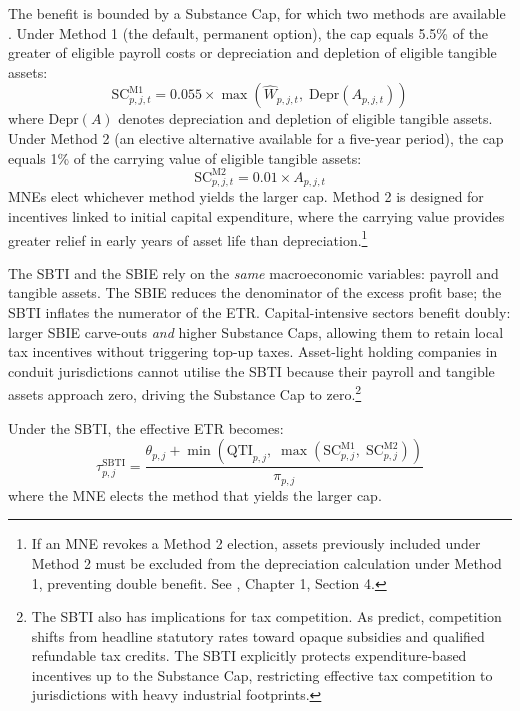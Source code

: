 \documentclass[11pt,a4paper]{article}
\begin{document}
The benefit is bounded by a Substance Cap, for which two methods are available \citep{oecd2026}. Under Method 1 (the default, permanent option), the cap equals 5.5\% of the greater of eligible payroll costs or depreciation and depletion of eligible tangible assets:
\begin{equation}\label{eq:substance_cap}
\text{SC}_{p,j,t}^{\text{M1}} = 0.055 \times \max\!\left(\hat{W}_{p,j,t},\; \text{Depr}(A_{p,j,t})\right)
\end{equation}
where $\text{Depr}(A)$ denotes depreciation and depletion of eligible tangible assets. Under Method 2 (an elective alternative available for a five-year period), the cap equals 1\% of the carrying value of eligible tangible assets:
\begin{equation}\label{eq:substance_cap_m2}
\text{SC}_{p,j,t}^{\text{M2}} = 0.01 \times A_{p,j,t}
\end{equation}
MNEs elect whichever method yields the larger cap. Method 2 is designed for incentives linked to initial capital expenditure, where the carrying value provides greater relief in early years of asset life than depreciation.\footnote{If an MNE revokes a Method 2 election, assets previously included under Method 2 must be excluded from the depreciation calculation under Method 1, preventing double benefit. See \citet{oecd2026}, Chapter 1, Section 4.}

The SBTI and the SBIE rely on the \emph{same} macroeconomic variables: payroll and tangible assets. The SBIE reduces the denominator of the excess profit base; the SBTI inflates the numerator of the ETR. Capital-intensive sectors benefit doubly: larger SBIE carve-outs \emph{and} higher Substance Caps, allowing them to retain local tax incentives without triggering top-up taxes. Asset-light holding companies in conduit jurisdictions cannot utilise the SBTI because their payroll and tangible assets approach zero, driving the Substance Cap to zero.\footnote{The SBTI also has implications for tax competition. As \citet{janeba2023} predict, competition shifts from headline statutory rates toward opaque subsidies and qualified refundable tax credits. The SBTI explicitly protects expenditure-based incentives up to the Substance Cap, restricting effective tax competition to jurisdictions with heavy industrial footprints.}

Under the SBTI, the effective ETR becomes:
\begin{equation}\label{eq:etr_sbti}
\tau_{p,j}^{\text{SBTI}} = \frac{\theta_{p,j} + \min\!\left(\text{QTI}_{p,j},\; \max\!\left(\text{SC}_{p,j}^{\text{M1}},\; \text{SC}_{p,j}^{\text{M2}}\right)\right)}{\pi_{p,j}}
\end{equation}
where the MNE elects the method that yields the larger cap.
\end{document}
